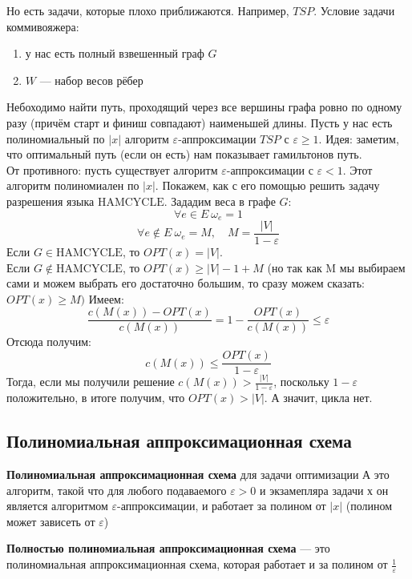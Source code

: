 \documentclass[11pt]{article}
\begin{document}
\begin{example}
    Но есть задачи, которые плохо приближаются. Например, $TSP$.  Условие задачи коммивояжера:
        \begin{enumerate}
        \item у нас есть полный взвешенный граф $G$
        \item $W$ --- набор весов рёбер
        
    \end{enumerate}
    Небоходимо найти путь, проходящий через все вершины графа ровно по одному разу (причём старт и финиш совпадают) наименьшей длины.
    Пусть у нас есть полиномиальный по $|x|$ алгоритм $\varepsilon$-аппроксимации $TSP$ с $\varepsilon\ge 1$.
    Идея: заметим, что оптимальный путь (если он есть) нам показывает гамильтонов путь. \\
    От противного: пусть существует алгоритм $\varepsilon$-аппроксимации с $\varepsilon<1$. Этот алгоритм полиномиален по $|x|. $ 
    Покажем, как с его помощью решить задачу разрешения языка $\mathrm{HAMCYCLE}$. 
    Зададим веса в графе $G$:
    \[ \forall e\in E \ \omega_e =1 \] 
    \[ \forall e\notin E \ \omega_e = M, \quad M = \frac{|V|}{1- \varepsilon} \] 
    Если $G\in \mathrm{HAMCYCLE}$, то $OPT(x) = |V|$.\\
    Если $G\notin \mathrm{HAMCYCLE}$, то $OPT(x) \ge |V|-1+ M $ (но так как M мы выбираем сами и можем выбрать его достаточно большим, то сразу можем сказать: $OPT(x)\ge M)$
    Имеем:
    \[ \frac{c(M(x))-OPT(x)}{c(M(x))} = 1 - \frac{OPT(x)}{c(M(x))} \le \varepsilon \]   
    Отсюда получим:
    \[ c(M(x)) \le \frac{OPT(x)}{1-\varepsilon} \]   
    Тогда, если мы получили решение $ c(M(x)) > \frac{|V|}{1-\varepsilon}$, поскольку $1-\varepsilon$ положительно, в итоге получим, что $OPT(x)> |V| $. А значит, цикла нет. 

\end{example}




\subsection{Полиномиальная аппроксимационная схема}


\begin{definition}
    \textbf{Полиномиальная аппроксимационная схема}  для задачи оптимизации А это алгоритм, такой что для любого подаваемого
    $\varepsilon>0$ и экзамепляра задачи х он является алгоритмом $\varepsilon$-аппроксимации, и работает за полином от $|x|$ (полином может зависеть от $\varepsilon$)
\end{definition}

\begin{definition}
    \textbf{Полностью полиномиальная аппроксимационная схема} --- это полиномиальная аппроксимационная схема, которая работает и за полином от $\frac{1}{\varepsilon}$
\end{definition}
\end{document}
